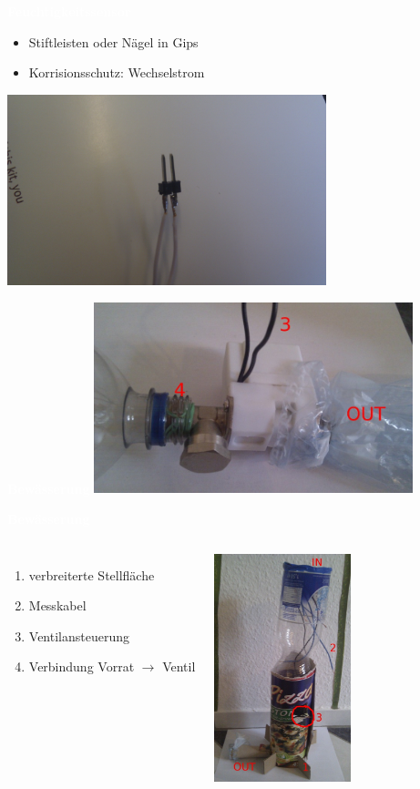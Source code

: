 \documentclass[bigger]{beamer}
\newcommand{\topic}[1]{{\huge{\textcolor{white}{\textbf{#1}}}}}
\begin{document}
\begin{frame}{\topic{Feuchtigkeitssensor}}
		\begin{itemize}
			\item Stiftleisten oder Nägel in Gips
			\item Korrisionsschutz: Wechselstrom
		\end{itemize}
		\includegraphics[width=350px]{IMAG0560.jpg}
\end{frame}

\begin{frame}{\topic{Bewässerung}}
       \includegraphics[width=350px]{Anschluss.jpg}
\end{frame}

\begin{frame}{\topic{Bewässerung}}
    \begin{columns}
        \begin{enumerate}
			\item verbreiterte Stellfläche
			\item Messkabel
			\item Ventilansteuerung
			\item Verbindung Vorrat $\rightarrow$ Ventil
        \end{enumerate}
        \includegraphics[width=150px]{System.jpg}
    \end{columns}
\end{frame} 
\end{document}
